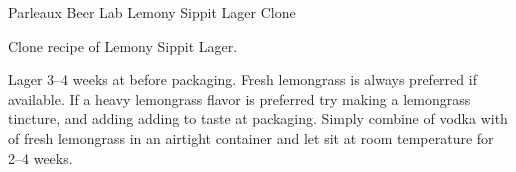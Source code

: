 \stylesection{\styleamericanlager}

\begin{recipe}{Parleaux Beer Lab Lemony Sippit Lager Clone}

\begin{aboutblock}
Clone recipe of Lemony Sippit Lager. \sourceaha
\end{aboutblock}


\begin{methodandtiming}
  
\begin{mashsteps}
\end{mashsteps}

\begin{fermentationsteps}
\end{fermentationsteps}

\begin{directions}
Lager 3--4 weeks at  before packaging. Fresh lemongrass is always
preferred if available. If a heavy lemongrass flavor is preferred try making
a lemongrass tincture, and adding adding to taste at packaging. Simply combine
 of vodka with  of fresh lemongrass in an airtight container
and let sit at room temperature for 2--4 weeks.
\end{directions}

\end{methodandtiming}

\recipebreak

\begin{ingredientsblock}

\begin{malts}
\end{malts}

\begin{hops}
\end{hops}


\end{ingredientsblock}

\end{recipe}

